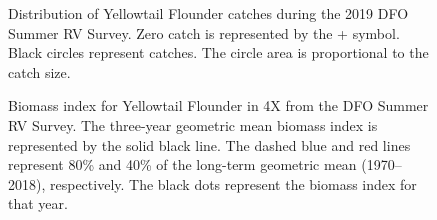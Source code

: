 \documentclass[11pt]{book}
\begin{document}
\begin{figure}[htb]

{\centering {} 

}

\caption{Distribution of Yellowtail Flounder catches during the 2019 DFO Summer RV Survey. Zero catch is represented by the + symbol. Black circles represent catches. The circle area is proportional to the catch size.}\label{fig:45-map-ytflounder}
\end{figure}

\begin{figure}[htb]

{\centering {} 

}

\caption{Biomass index for Yellowtail Flounder in 4X from the DFO Summer RV Survey. The three-year geometric mean biomass index is represented by the solid black line. The dashed blue and red lines represent 80\% and 40\% of the long-term geometric mean (1970--2018), respectively. The black dots represent the biomass index for that year.}\label{fig:46-fig-ytflounder-biomass4X}
\end{figure}
\end{document}
